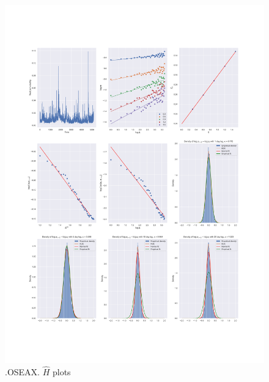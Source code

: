 	\begin{figure}[h]
		\centering
		\includegraphics[width=\linewidth]{fig/.OSEAX.pdf}
		\caption{.OSEAX. $\hat{H}$ plots}
	\end{figure}

